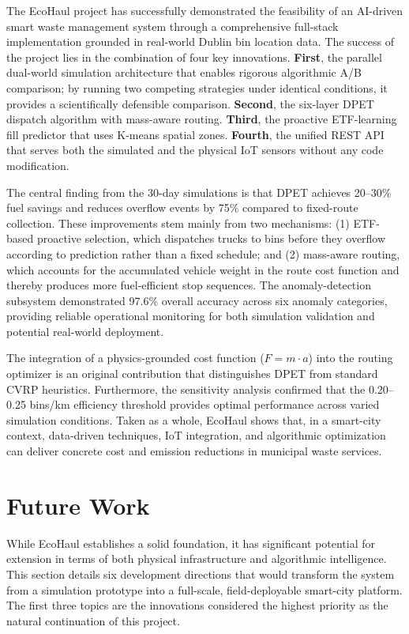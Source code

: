 \documentclass[12pt,a4paper]{report}
\begin{document}
\indent The EcoHaul project has successfully demonstrated the feasibility of an AI-driven smart waste management system through a comprehensive full-stack implementation grounded in real-world Dublin bin location data. The success of the project lies in the combination of four key innovations. \textbf{First}, the parallel dual-world simulation architecture that enables rigorous algorithmic A/B comparison; by running two competing strategies under identical conditions, it provides a scientifically defensible comparison. \textbf{Second}, the six-layer DPET dispatch algorithm with mass-aware routing. \textbf{Third}, the proactive ETF-learning fill predictor that uses K-means spatial zones. \textbf{Fourth}, the unified REST API that serves both the simulated and the physical IoT sensors without any code modification.

\indent The central finding from the 30-day simulations is that DPET achieves 20--30\% fuel savings and reduces overflow events by 75\% compared to fixed-route collection. These improvements stem mainly from two mechanisms: (1) ETF-based proactive selection, which dispatches trucks to bins before they overflow according to prediction rather than a fixed schedule; and (2) mass-aware routing, which accounts for the accumulated vehicle weight in the route cost function and thereby produces more fuel-efficient stop sequences. The anomaly-detection subsystem demonstrated 97.6\% overall accuracy across six anomaly categories, providing reliable operational monitoring for both simulation validation and potential real-world deployment.

\indent The integration of a physics-grounded cost function ($F = m \cdot a$) into the routing optimizer is an original contribution that distinguishes DPET from standard CVRP heuristics. Furthermore, the sensitivity analysis confirmed that the 0.20--0.25 bins/km efficiency threshold provides optimal performance across varied simulation conditions. Taken as a whole, EcoHaul shows that, in a smart-city context, data-driven techniques, IoT integration, and algorithmic optimization can deliver concrete cost and emission reductions in municipal waste services.

\section{Future Work}

\indent While EcoHaul establishes a solid foundation, it has significant potential for extension in terms of both physical infrastructure and algorithmic intelligence. This section details six development directions that would transform the system from a simulation prototype into a full-scale, field-deployable smart-city platform. The first three topics are the innovations considered the highest priority as the natural continuation of this project.
\end{document}
